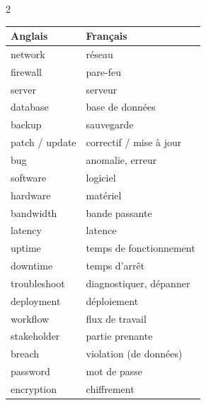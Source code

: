 \documentclass[a4paper,10pt]{article}
\begin{document}
\begin{multicols}{2}
\begin{tcolorbox}[basebox, colframe=teal, title=4. ANGLAIS — Vocabulaire informatique]
\begin{tabular}{ll}
\toprule
\textbf{Anglais} & \textbf{Français} \\
\midrule
network & réseau \\
firewall & pare-feu \\
server & serveur \\
database & base de données \\
backup & sauvegarde \\
patch / update & correctif / mise à jour \\
bug & anomalie, erreur \\
software & logiciel \\
hardware & matériel \\
bandwidth & bande passante \\
latency & latence \\
uptime & temps de fonctionnement \\
downtime & temps d'arrêt \\
troubleshoot & diagnostiquer, dépanner \\
deployment & déploiement \\
workflow & flux de travail \\
stakeholder & partie prenante \\
breach & violation (de données) \\
password & mot de passe \\
encryption & chiffrement \\
\bottomrule
\end{tabular}
\end{tcolorbox}


\end{multicols}
\end{document}
